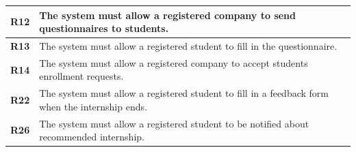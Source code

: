 \begin{table}[H]
\begin{tabular}{|l|m{10cm}|}
        \hline \textbf{R12} & The system must allow a registered company to send questionnaires to students. \\
        \hline \textbf{R13} & The system must allow a registered student to fill in the questionnaire. \\
        \hline \textbf{R14} & The system must allow a registered company to accept students enrollment requests. \\
        \hline \textbf{R22} & The system must allow a registered student to fill in a feedback form when the internship ends. \\
        \hline \textbf{R26} & The system must allow a registered student to be notified about recommended internship. \\
        \hline
    \end{tabular}
\end{table}

